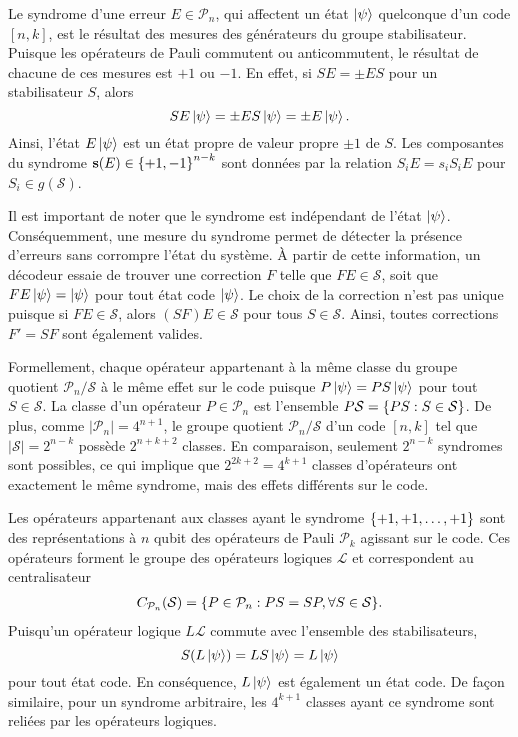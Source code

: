 Le syndrome d'une erreur $E \in \mathcal P_n$,
qui affectent un état $\ket\psi$ quelconque d'un code $[n, k]$,
est le résultat des mesures des générateurs du groupe stabilisateur.
Puisque les opérateurs de Pauli commutent ou anticommutent,
le résultat de chacune de ces mesures est $+1$ ou $-1$.
En effet, si $SE = \pm ES$ pour un stabilisateur $S$,
alors
\begin{equation}
  SE\ket\psi = \pm E S \ket\psi = \pm E\ket\psi.
\end{equation}
Ainsi,
l'état $E\ket\psi$ est un état propre de valeur propre $\pm 1$ de $S$.
Les composantes du syndrome $\vb{s}(E) \in \qty{+1, -1}^{n - k}$
sont données par la relation $S_iE = s_i S_i E$ pour $S_i \in g(\mathcal S)$.

Il est important de noter que le syndrome est indépendant de l'état $\ket \psi$.
Conséquemment,
une mesure du syndrome permet de détecter la présence d'erreurs sans corrompre l'état du système.
À partir de cette information,
un décodeur essaie de trouver une correction $F$ telle que $FE \in \mathcal S$, 
soit que $FE\ket\psi = \ket\psi$ pour tout état code $\ket\psi$.
Le choix de la correction n'est pas unique puisque si $FE \in \mathcal S$,
alors $(SF)E \in \mathcal S$ pour tous $S \in \mathcal S$.
Ainsi,
toutes corrections $F' = SF$ sont également valides.

Formellement,
chaque opérateur appartenant à la même classe du groupe quotient $\mathcal P_n/\mathcal S$
à le même effet sur le code puisque $P\ket\psi = PS\ket\psi$ pour tout $S \in \mathcal S$.
La classe d'un opérateur $P \in \mathcal P_n$ est l'ensemble 
$P\mathcal S = \qty{PS : S\in \mathcal S}$.
De plus,
comme $|\mathcal P_n| = 4^{n+1}$,
le groupe quotient $\mathcal P_n/\mathcal S$ d'un code $[n, k]$ tel que $|\mathcal S| = 2^{n - k}$
possède $2^{n+k+2}$ classes.
En comparaison,
seulement $2^{n-k}$ syndromes sont possibles,
ce qui implique que $2^{2k + 2} = 4^{k + 1}$ classes d'opérateurs ont exactement le même syndrome,
mais des effets différents sur le code.

Les opérateurs appartenant aux classes ayant le syndrome $\qty{+1, +1, \ldots, +1}$
sont des représentations à $n$ qubit des opérateurs de Pauli $\mathcal P_k$
agissant sur le code.
Ces opérateurs forment le groupe des opérateurs logiques $\mathcal L$ et correspondent
au centralisateur 
\begin{align}
  C_{\mathcal P_n}(\mathcal S) 
  = \qty{P \in \mathcal P_n : PS = SP, \forall S \in \mathcal S}.
\end{align}
Puisqu'un opérateur logique $L \mathcal L$ commute avec l'ensemble des stabilisateurs,
\begin{equation}
  S(L\ket\psi) = LS\ket\psi = L\ket\psi
\end{equation}
pour tout état code.
En conséquence,
$L\ket\psi$ est également un état code.
De façon similaire,
pour un syndrome arbitraire,
les $4^{k+1}$ classes ayant ce syndrome sont reliées par les opérateurs logiques.

